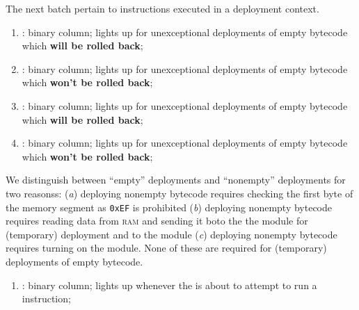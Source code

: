 The next batch pertain to  instructions executed in a deployment context.
\begin{enumerate}[resume]
	\item \scenReturnFromDeploymentEmptyByteCodeWillRevert:
		binary column;
		lights up for unexceptional  deployments of empty bytecode which \textbf{will be rolled back};
	\item \scenReturnFromDeploymentEmptyByteCodeWontRevert:
		binary column;
		lights up for unexceptional  deployments of empty bytecode which \textbf{won't be rolled back};
	\item \scenReturnFromDeploymentNonemptyByteCodeWillRevert:
		binary column;
		lights up for unexceptional  deployments of empty bytecode which \textbf{will be rolled back};
	\item \scenReturnFromDeploymentNonemptyByteCodeWontRevert:
		binary column;
		lights up for unexceptional  deployments of empty bytecode which \textbf{won't be rolled back};
\end{enumerate}
\saNote{} We distinguish between ``empty'' deployments and ``nonempty'' deployments for two reasonss:
(\emph{a}) deploying nonempty bytecode requires checking the first byte of the memory segment as \texttt{0xEF} is prohibited
(\emph{b}) deploying nonempty bytecode requires reading data from \textsc{ram} and sending it boto the the \romMod{} module for (temporary) deployment and to the \hashDataMod{} module
(\emph{c}) deploying nonempty bytecode requires turning on the \hashInfoMod{} module.
None of these are required for (temporary) deployments of empty bytecode.

\begin{enumerate}[resume]
	\item \scenSelfdestruct:
		binary column; lights up whenever the \zkEvm{} is about to attempt to run a  instruction;
\end{enumerate}
